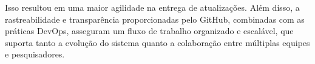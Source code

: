 Isso resultou em uma maior agilidade na entrega de atualizações. Além disso, a rastreabilidade e transparência proporcionadas pelo GitHub, combinadas com as práticas DevOps, asseguram um fluxo de trabalho organizado e escalável, que suporta tanto a evolução do sistema quanto a colaboração entre múltiplas equipes e pesquisadores.






